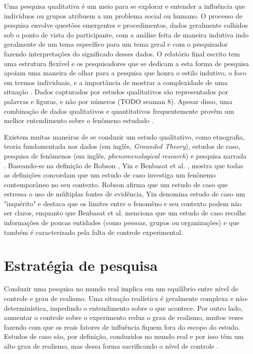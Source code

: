 Uma pesquisa qualitativa é um meio para se explorar e entender a influência que indivíduos ou grupos atribuem a um
problema social ou humano. O processo de pesquisa envolve questões emergentes e procedimentos, dados geralmente colhidos
sob o ponto de vista do participante, com a análise feita de maneira indutiva indo geralmente de um tema específico 
para um tema geral e com o pesquisador fazendo interpretações do significado desses dados. 
O relatório final escrito tem uma estrutura flexível e os pesquisadores que se dedicam a esta forma de pesquisa 
apoiam uma maneira de olhar para a pesquisa que honra o estilo indutivo, o foco em termos individuais, 
e a importância de mostrar a complexidade de uma situação \cite{creswell}. Dados capturados por estudos qualitativos
são representados por palavras e figuras, e não por números (TODO seaman 8). Apesar disso, uma combinação de dados
qualitativos e quantitativos frequentemente provêm um melhor entendimento sobre o fenômeno estudado \cite{seaman}.  

Existem muitas maneiras de se conduzir
um estudo qualitativo, como etnografia, teoria fundamentada nos dados (em inglês, \textit{Grounded Theory}), estudos de caso,
pesquisa de fenômenos (em inglês, \textit{phenomenological research}) e pesquisa narrada \cite{creswell}. 
Baseando-se na definição de Robson \cite{robson}, Yin \cite{yin} e Benbasat et al. \cite{benbasat}, \cite{guidelines-case-study} 
mostra que todas as definições concordam que um estudo de caso investiga um fenônemo contemporâneo no seu contexto. Robson afirma
que um estudo de caso que estressa o uso de múltiplas fontes de evidência, Yin denomina estudo de caso um "inquérito" e
destaca que os limites entre o fenomêno e seu contexto podem não ser claros, enquanto que Benbasat et al. menciona que um estudo
de caso recolhe informações de poucas entidades (como pessoas, grupos ou organizações) e que também é caracterizado pela
falta de controle experimental.

\section{Estratégia de pesquisa} 
\label{sec:planejamento-estrategia}

Conduzir uma pesquisa no mundo real implica em um equilíbrio entre nível de controle e grau de realismo. 
Uma situação realística é geralmente complexa e não-determinística, impedindo o entendimento sobre o que
acontece. Por outro lado, aumentar o controle sobre o experimento reduz o grau de realismo, muitos
vezes fazendo com que os reais fatores de influência fiquem fora do escopo do estudo. Estudos de caso são,
por definição, conduzidos no mundo real e por isso têm um alto grau de realismo, mas dessa forma sacrificando
o nível de controle \cite{guidelines-case-study}.

